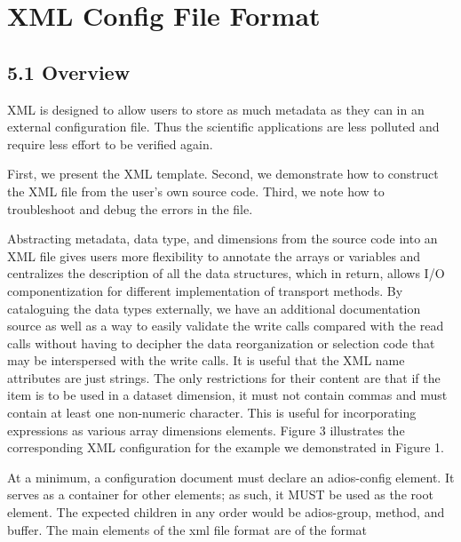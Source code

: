 \chapter{XML Config File Format}

\section*{{\large 5.1 }{\large \textbf{ \label{HToc84890241}\label{HToc212016617}\label{HToc212016859}\label{HToc182553364}Overview}}}

\leftskip=0pt
XML is designed to allow users to store as much metadata as they can in an external 
configuration file. Thus the scientific applications are less polluted and require 
less effort to be verified again.

First, we present the XML template. Second, we demonstrate how to construct the 
XML file from the user's own source code. Third, we note how to troubleshoot and 
debug the errors in the file.  

Abstracting metadata, data type, and dimensions from the source code into an XML 
file gives users more flexibility to annotate the arrays or variables and centralizes 
the description of all the data structures, which in return, allows I/O componentization 
for different implementation of transport methods. By cataloguing the data types 
externally, we have an additional documentation source as well as a way to easily 
validate the write calls compared with the read calls without having to decipher 
the data reorganization or selection code that may be interspersed with the write 
calls. It is useful that the XML name attributes are just strings. The only restrictions 
for their content are that if the item is to be used in a dataset dimension, it 
must not contain commas and must contain at least one non-numeric character. This 
is useful for incorporating expressions as various array dimensions elements. Figure 
3 illustrates the corresponding XML configuration for the example we demonstrated 
in Figure 1. 

At a minimum, a configuration document must declare an adios-config element. It 
serves as a container for other elements; as such, it MUST be used as the root 
element. The expected children in any order would be adios-group, method, and buffer. 
The main elements of the xml file format are of the format 

